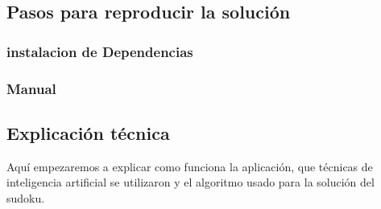 \documentclass{article}
\begin{document}
\subsection{Pasos para reproducir la solución}
\subsubsection{instalacion de Dependencias}
\subsubsection{Manual}
\subsection{Explicación técnica}
Aquí empezaremos a explicar como funciona la aplicación, que técnicas de inteligencia artificial se utilizaron y el algoritmo usado para la solución del sudoku.
\end{document}
